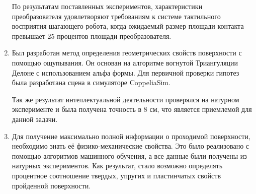 \begin{enumerate}
  По результатам поставленных экспериментов, характеристики преобразователя удовлетворяют требованиям к системе тактильного восприятия шагающего робота, когда ожидаемый размер площади контакта превышает 25 процентов площади преобразователя.
  \item Был разработан метод определения геометрических свойств поверхности с помощью ощупывания. Он основан на алгоритме вогнутой Триангуляции Делоне с использованием альфа формы. Для первичной проверки гипотез была разработана сцена в симуляторе CoppeliaSim.

  Так же результат интеллектуальной деятельности проверялся на натурном эксперименте и была получена точность в 8 см, что является приемлемой для данной задачи.
  \item Для получение максимально полной информации о проходимой поверхности, необходимо знать её физико-механические свойства. Это было реализовано с помощью алгоритмов машинного обучения, а все данные были получены из натурных экспериментов. Как результат, стало возможно определять процентное соотношение твердых, упругих и пластинчатых свойств пройденной поверхности.
\end{enumerate}